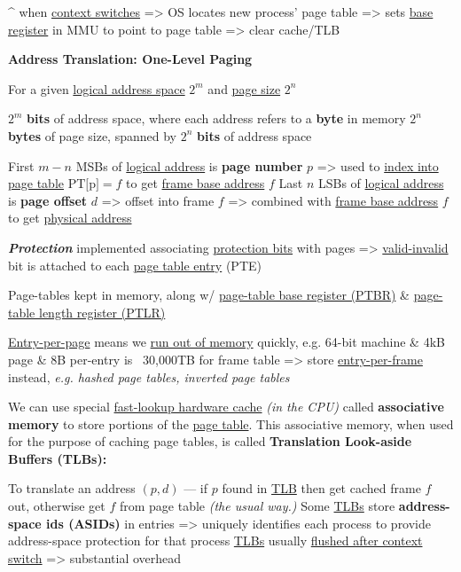 \^{} when \ul{context switches} => OS locates new process' page table 
=> sets \ul{base register} in MMU to point to page table
=> clear cache/TLB

\hSep

\textbf{Address Translation: One-Level Paging}

\begin{enumerate}
    \vItem For a given \ul{logical address space} $2^m$ and \ul{page size} $2^n$

    \begin{enumerate}
        \vItem $2^m$ \textbf{bits} of address space, where each address refers to a \textbf{byte} in memory
        \vItem $2^n$ \textbf{bytes} of page size, spanned by $2^n$ \textbf{bits} of address space
    \end{enumerate}
    
    \vItem First $m-n$ MSBs of \ul{logical address} is \textbf{page number} $p$
    => used to \ul{index into page table} \textcolor{cornellred}{$\textrm{PT[p]}=f$} to get
    \ul{frame base address} $f$
    \vItem Last $n$ LSBs of \ul{logical address} is \textbf{page offset} $d$ => offset into frame $f$ 
    => combined with \ul{frame base address} $f$ to get \ul{physical address}

    \vItem \textit{\textbf{Protection}} implemented associating \ul{protection bits} with pages
    => \ul{valid-invalid} bit is attached to each \ul{page table entry} (PTE)

    \vItem Page-tables kept in memory, along w/ \ul{page-table base register (PTBR)} \& \ul{page-table length register (PTLR)}

    \vItem \ul{Entry-per-page} means we \ul{run out of memory} quickly, e.g. 64-bit machine \& 4kB page
    \& 8B per-entry is ~30,000TB for frame table =>
    store \ul{entry-per-frame} instead, \textit{e.g. hashed page tables, inverted page tables}
\end{enumerate}

\hSep

We can use special \ul{fast-lookup hardware cache} \textit{(in the CPU)} called \textbf{associative memory} to store portions 
of the \ul{page table}. This associative memory, when used for the purpose of caching page tables, is called 
\textbf{Translation Look-aside Buffers (TLBs):}
\begin{enumerate}
    \vItem To translate an address $(p, d)$ — if $p$ found in \ul{TLB} then get cached frame $f$ out,
    otherwise get $f$ from page table \textit{(the usual way.)}
    \vItem Some \ul{TLBs} store \textbf{address-space ids (ASIDs)} in entries
	=> uniquely identifies each process to provide address-space protection for that process
    \vItem \ul{TLBs} usually \ul{flushed after context switch} => substantial overhead
\end{enumerate}

